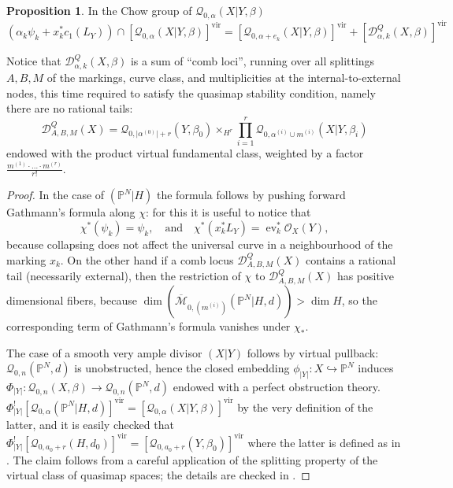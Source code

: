 \documentclass[11pt]{amsart}
\newcommand{\M}[4]{\overline{\mathcal{M}}_{#1,#2}(#3,#4)}
\newcommand{\Q}[4]{\mathcal{Q}_{#1,#2}(#3,#4)}
\newcommand{\PP}{\mathbb P}
\newcommand{\OO}{\mathcal{O}}
\renewcommand{\to}{\rightarrow}
\newcommand{\virt}[1]{[#1]^{\operatorname{vir}}}
\newcommand{\ev}{\operatorname{ev}}
\theoremstyle{definition}
\newtheorem{prop}[thm]{Proposition}
\theoremstyle{definition}
\begin{document}
\begin{prop}\label{prop:quasimap_Gathmann_formula} In the Chow group of $\Q{0}{\alpha}{X|Y}{\beta}$
 \begin{equation*} (\alpha_k \psi_k + x_k^*c_1(L_Y)) \cap \virt{\Q{0}{\alpha}{X|Y}{\beta}} = \virt{\Q{0}{\alpha+e_k}{X|Y}{\beta}} + \virt{\mathcal{D}^Q_{\alpha,k}(X,\beta)} \end{equation*}
\end{prop}
Notice that $\mathcal{D}^Q_{\alpha,k}(X,\beta)$ is a sum of ``comb loci'', running over all splittings $A,B,M$ of the markings, curve class, and multiplicities at the internal-to-external nodes, this time required to satisfy the quasimap stability condition, namely there are no rational tails:
\[\mathcal{D}^Q_{A,B,M}(X)=\Q{0}{\lvert\alpha^{(0)}\rvert+r}{Y}{\beta_0}\times_{H^r}\prod_{i=1}^r
\Q{0}{\alpha^{(i)}\cup m^{(i)}}{X|Y}{\beta_i}\]
endowed with the product virtual fundamental class, weighted by a factor $\frac{m^{(1)}\cdot\ldots\cdot m^{(r)}}{r!}$.
\begin{proof}
 In the case of $(\PP^N|H)$ the formula follows by pushing forward Gathmann's formula along $\chi$: for this it is useful to notice that
 \begin{equation}
  \chi^*(\psi_k)=\psi_k, \quad \text{and} \quad \chi^*(x_k^*L_Y)=\ev_k^*\OO_X(Y),
 \end{equation}
because collapsing does not affect the universal curve in a neighbourhood of the marking $x_k$. On the other hand if a comb locus $\mathcal{D}^Q_{A,B,M}(X)$ contains a rational tail (necessarily external), then the restriction of $\chi$ to $\mathcal{D}^Q_{A,B,M}(X)$ has positive dimensional fibers, because $\dim(\M{0}{(m^{(i)})}{\PP^N|H}{d})>\dim H$, so the corresponding term of Gathmann's formula vanishes under $\chi_*$.

The case of a smooth very ample divisor $(X|Y)$ follows by virtual pullback: $\Q{0}{n}{\PP^N}{d}$ is unobstructed, hence the  closed embedding $\phi_{\lvert Y\rvert}\colon X\hookrightarrow \PP^N$ induces $\Phi_{\lvert Y\rvert}\colon \Q{0}{n}{X}{\beta}\to \Q{0}{n}{\PP^N}{d}$ endowed with a perfect obstruction theory. $\Phi_{\lvert Y\rvert}^!\virt{\Q{0}{\alpha}{\PP^N|H}{d}}=\virt{\Q{0}{\alpha}{X|Y}{\beta}}$ by the very definition of the latter, and it is easily checked that $\Phi_{\lvert Y\rvert}^!\virt{\Q{0}{a_0+r}{H}{d_0}}=\virt{\Q{0}{a_0+r}{Y}{\beta_0}}$ where the latter is defined as in \cite{CFKM}. The claim follows from a careful application of the splitting property of the virtual class of quasimap spaces; the details are checked in \cite[\S 4 and Appendix B.4]{BN}.
\end{proof}
\end{document}
